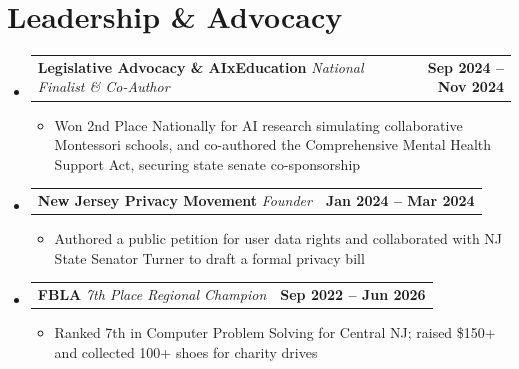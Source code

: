 \documentclass[letterpaper,11pt]{article}
\makeatletter
\newcommand{\resumeItem}[1]{
  \item\small{
    {#1 \vspace{-3pt}}
  }
}
\newcommand{\resumeProjectHeading}[2]{
    \item
    \begin{tabular*}{1.001\textwidth}{l@{\extracolsep{\fill}}r}
      \small#1 & \textbf{\small #2}\\
    \end{tabular*}\vspace{-9pt}
}
\newcommand{\resumeSubHeadingListStart}{\begin{itemize}[leftmargin=0.0in, label={}]}
\newcommand{\resumeSubHeadingListEnd}{\end{itemize}}
\newcommand{\resumeItemListStart}{\begin{itemize}[leftmargin=0.15in, labelsep=0.05in]}
\newcommand{\resumeItemListEnd}{\end{itemize}\vspace{-7pt}}
\makeatother
\begin{document}
\section{Leadership \& Advocacy}
   \vspace{-5pt}
   \resumeSubHeadingListStart
      \resumeProjectHeading
          {\textbf{Legislative Advocacy \& AIxEducation} \textbar{} \emph{National Finalist \& Co-Author}}{Sep 2024 -- Nov 2024}
          \resumeItemListStart
            \resumeItem{Won 2nd Place Nationally for AI research simulating collaborative Montessori schools, and co-authored the Comprehensive Mental Health Support Act, securing state senate co-sponsorship}
          \resumeItemListEnd
          \vspace{-16pt}
      \resumeProjectHeading
          {\textbf{New Jersey Privacy Movement} \textbar{} \emph{Founder}}{Jan 2024 -- Mar 2024}
          \resumeItemListStart
            \resumeItem{Authored a public petition for user data rights and collaborated with NJ State Senator Turner to draft a formal privacy bill}
          \resumeItemListEnd
          \vspace{-16pt}
      \resumeProjectHeading
          {\textbf{FBLA} \textbar{} \emph{7th Place Regional Champion}}{Sep 2022 -- Jun 2026}
          \resumeItemListStart
            \resumeItem{Ranked 7th in Computer Problem Solving for Central NJ; raised \$150+ and collected 100+ shoes for charity drives}
          \resumeItemListEnd
   \resumeSubHeadingListEnd
\end{document}

